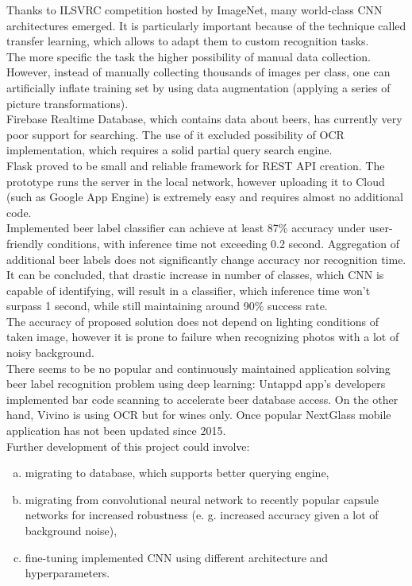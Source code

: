 \documentclass[11pt]{article}
\begin{document}
Thanks to ILSVRC competition hosted by ImageNet, many world-class CNN architectures emerged. It is particularly important because of the technique called transfer learning, which allows to adapt them to custom recognition tasks.\\

The more specific the task the higher possibility of manual data collection. However, instead of manually collecting thousands of images per class, one can artificially inflate training set by using data augmentation (applying a series of picture transformations).\\

Firebase Realtime Database, which contains data about beers, has currently very poor support for searching. The use of it excluded possibility of OCR implementation, which requires a solid partial query search engine.\\

Flask proved to be small and reliable framework for REST API creation. The prototype runs the server in the local network, however uploading it to Cloud (such as Google App Engine) is extremely easy and requires almost no additional code. \\

Implemented beer label classifier can achieve at least 87\% accuracy under user-friendly conditions, with inference time not exceeding 0.2 second. Aggregation of additional beer labels does not significantly change accuracy nor recognition time. It can be concluded, that drastic increase in number of classes, which CNN is capable of identifying, will result in a classifier, which inference time won't surpass 1 second, while still maintaining around 90\% success rate. \\

The accuracy of proposed solution does not depend on lighting conditions of taken image, however it is prone to failure when recognizing photos with a lot of noisy background.\\

There seems to be no popular and continuously maintained application solving beer label recognition problem using deep learning: Untappd app's developers implemented bar code scanning to accelerate beer database access. On the other hand, Vivino is using OCR but for wines only. Once popular NextGlass mobile application has not been updated since 2015. \\

Further development of this project could involve: 
\begin{enumerate}[a)]
\item migrating to database, which supports better querying engine,
\item migrating from convolutional neural network to recently popular capsule networks for increased robustness (e. g. increased accuracy given a lot of background noise),
\item fine-tuning implemented CNN using different architecture and hyperparameters.
\end{enumerate}
\clearpage



\end{document}
